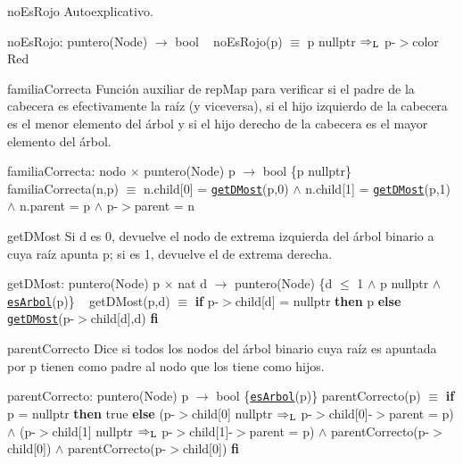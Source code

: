 \begin{DoxyParagraph}{no\+Es\+Rojo}
Autoexplicativo.

no\+Es\+Rojo\+: puntero(\+Node) $\to$ bool ~\newline
 no\+Es\+Rojo(p) $\equiv$ p  nullptr $\Rightarrow_{\rm L}$ p-\/$>$color  Red


\end{DoxyParagraph}
\begin{DoxyParagraph}{familia\+Correcta}
Función auxiliar de rep\+Map para verificar si el padre de la cabecera es efectivamente la raíz (y viceversa), si el hijo izquierdo de la cabecera es el menor elemento del árbol y si el hijo derecho de la cabecera es el mayor elemento del árbol.

familia\+Correcta\+: nodo $\times$ puntero(\+Node) p $\to$ bool \{p  nullptr\} ~\newline
 familia\+Correcta(n,p) $\equiv$ n.\+child\mbox{[}0\mbox{]} = \href{axiomas.html#getDMost}{\tt get\+D\+Most}(p,0) $\land$ n.\+child\mbox{[}1\mbox{]} = \href{axiomas.html#getDMost}{\tt get\+D\+Most}(p,1) $\land$ n.\+parent = p $\land$ p-\/$>$parent = n


\end{DoxyParagraph}
\begin{DoxyParagraph}{get\+D\+Most}
Si d es 0, devuelve el nodo de extrema izquierda del árbol binario a cuya raíz apunta p; si es 1, devuelve el de extrema derecha.

get\+D\+Most\+: puntero(\+Node) p $\times$ nat d $\to$ puntero(\+Node) \{d $\leq$ 1 $\land$ p  nullptr $\land$ \href{axiomas.html#esArbol}{\tt es\+Arbol}(p)\} ~\newline
 get\+D\+Most(p,d) $\equiv$ {\bfseries if} p-\/$>$child\mbox{[}d\mbox{]} = nullptr {\bfseries then} p {\bfseries else} \href{axiomas.html#getDMost}{\tt get\+D\+Most}(p-\/$>$child\mbox{[}d\mbox{]},d) {\bfseries fi} 


\end{DoxyParagraph}
\begin{DoxyParagraph}{parent\+Correcto}
Dice si todos los nodos del árbol binario cuya raíz es apuntada por p tienen como padre al nodo que los tiene como hijos.

parent\+Correcto\+: puntero(\+Node) p $\to$ bool \{\href{axiomas.html#esArbol}{\tt es\+Arbol}(p)\} parent\+Correcto(p) $\equiv$ {\bfseries if} p = nullptr {\bfseries then} true {\bfseries else} (p-\/$>$child\mbox{[}0\mbox{]}  nullptr $\Rightarrow_{\rm L}$ p-\/$>$child\mbox{[}0\mbox{]}-\/$>$parent = p) $\land$ (p-\/$>$child\mbox{[}1\mbox{]}  nullptr $\Rightarrow_{\rm L}$ p-\/$>$child\mbox{[}1\mbox{]}-\/$>$parent = p) $\land$ parent\+Correcto(p-\/$>$child\mbox{[}0\mbox{]}) $\land$ parent\+Correcto(p-\/$>$child\mbox{[}0\mbox{]}) {\bfseries fi} 


\end{DoxyParagraph}
